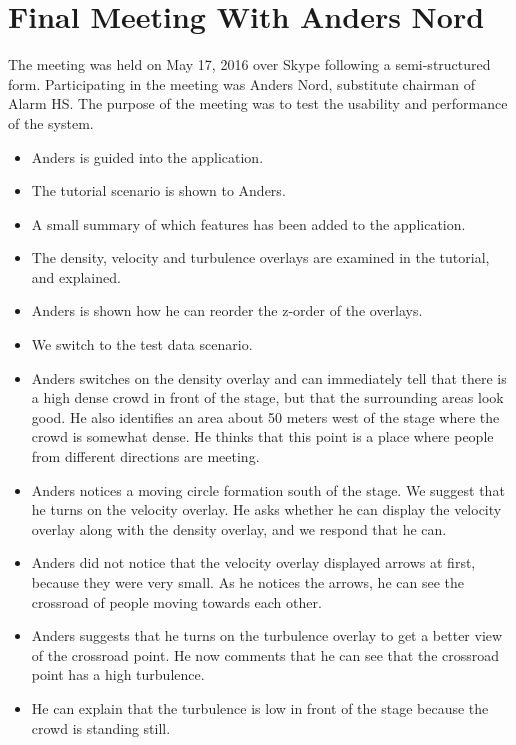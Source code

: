 \section{Final Meeting With Anders Nord}

The meeting was held on May 17, 2016 over Skype following a semi-structured form. Participating in the meeting was Anders Nord, substitute chairman of Alarm HS. The purpose of the meeting was to test the usability and performance of the system.


\begin{itemize}
    \item Anders is guided into the application.
    \item The tutorial scenario is shown to Anders.
    \item A small summary of which features has been added to the application.
    \item The density, velocity and turbulence overlays are examined in the tutorial, and explained.
    \item Anders is shown how he can reorder the z-order of the overlays.
    \item We switch to the test data scenario.
    \item Anders switches on the density overlay and can immediately tell that there is a high dense crowd in front of the stage, but that the surrounding areas look good. He also identifies an area about 50 meters west of the stage where the crowd is somewhat dense. He thinks that this point is a place where people from different directions are meeting.
    \item Anders notices a moving circle formation south of the stage. We suggest that he turns on the velocity overlay. He asks whether he can display the velocity overlay along with the density overlay, and we respond that he can.
    \item Anders did not notice that the velocity overlay displayed arrows at first, because they were very small. As he notices the arrows, he can see the crossroad of people moving towards each other.
    \item Anders suggests that he turns on the turbulence overlay to get a better view of the crossroad point. He now comments that he can see that the crossroad point has a high turbulence.
    \item He can explain that the turbulence is low in front of the stage because the crowd is standing still.

\end{itemize}
